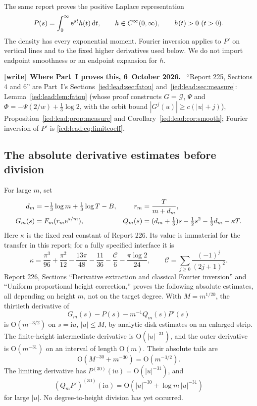 \documentclass[11pt,letterpaper]{article}
\theoremstyle{remark}\newtheorem{remark}[theorem]{Remark}
\newcommand{\ii}{\mathrm i}\newcommand{\dd}{\,\mathrm d}
\newcommand{\Oh}{\mathrm O}\newcommand{\supp}{\operatorname{supp}}
\newenvironment{writenote}[1][]{\par\smallskip\begingroup\small
 \noindent\textbf{[write]}\if\relax\detokenize{#1}\relax\else~\textbf{#1.}\fi\ }%
 {\par\endgroup\smallskip}
\begin{document}
The same report proves the positive Laplace representation
\begin{equation}\label{ied:log:eq:density}
 P(s)=\int_0^\infty\e^{st}h(t)\dd t,
 \qquad h\in C^\infty(0,\infty),\qquad h(t)>0\ (t>0).
\end{equation}
The density has every exponential moment. Fourier inversion applies to $P'$ on vertical lines and to the fixed higher derivatives used below. We do not import endpoint smoothness or an endpoint expansion for $h$.

\begin{writenote}[Where Part~I proves this, 6~October 2026]
``Report 225, Sections 4 and 6'' are Part~I's Sections~\ref{ied:lead:sec:fatou} and~\ref{ied:lead:sec:measure}: Lemma~\ref{ied:lead:lem:fatou} (whose proof constructs $G=\mathcal G$, $\Psi$ and $\Phi=-\Psi(2/w)+\frac13\log2$, with the orbit bound $|G^j(u)|\ge c(|u|+j)$), Proposition~\ref{ied:lead:prop:measure} and Corollary~\ref{ied:lead:cor:smooth}; Fourier inversion of $P'$ is \eqref{ied:lead:eq:limitcoeff}.
\end{writenote}

\subsection{The absolute derivative estimates before division}
For large $m$, set
\begin{align}\label{ied:log:eq:scaling}
 d_m&=-\tfrac13\log m+\tfrac13\log T-B,
 &r_m&=\frac{T}{m+d_m},\notag\\
 G_m(s)&=F_m(r_m\mathrm e^{s/m}),
 &Q_m(s)&=(d_m+\tfrac13)s-\tfrac12s^2-\tfrac13d_m-\kappa T.
\end{align}
Here $\kappa$ is the fixed real constant of Report 226. Its value is immaterial for the transfer in this report; for a fully specified interface it is
\[
 \kappa=\frac{\pi^3}{96}+\frac{\pi^2}{12}-\frac{13\pi}{48}
 -\frac{11}{36}-\frac{\mathcal C}{6}-\frac{\pi\log2}{24},
 \qquad \mathcal C=\sum_{j\ge0}\frac{(-1)^j}{(2j+1)^2}.
\]
Report 226, Sections ``Derivative extraction and classical Fourier inversion'' and ``Uniform proportional height correction,'' proves the following absolute estimates, all depending on height $m$, not on the target degree. With $M=m^{1/20}$, the thirtieth derivative of
\[
 G_m(s)-P(s)-m^{-1}Q_m(s)P'(s)
\]
is $\Oh(m^{-3/2})$ on $s=\ii u$, $|u|\le M$, by analytic disk estimates on an enlarged strip. The finite-height intermediate derivative is $\Oh(|u|^{-31})$, and the outer derivative is $\Oh(m^{-31})$ on an interval of length $\Oh(m)$. Their absolute tails are
\begin{equation}\label{ied:log:eq:tails}
 \Oh(M^{-30}+m^{-30})=\Oh(m^{-3/2}).
\end{equation}
The limiting derivative has $P^{(30)}(\ii u)=\Oh(|u|^{-31})$, and
\begin{equation}\label{ied:log:eq:Qtail}
 (Q_mP')^{(30)}(\ii u)
   =\Oh(|u|^{-30}+\log m\,|u|^{-31})
\end{equation}
for large $|u|$. No degree-to-height division has yet occurred.
\end{document}
